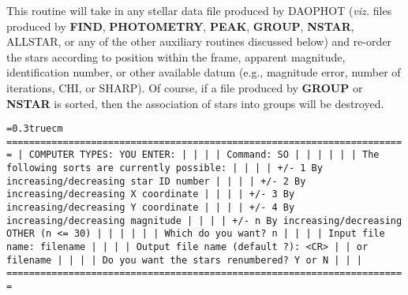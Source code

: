 This routine will take in any stellar data file produced by DAOPHOT
({\it viz.} files produced by {\bf FIND}, {\bf PHOTOMETRY}, {\bf PEAK},
{\bf GROUP}, {\bf NSTAR}, ALLSTAR, or any of the other auxiliary
routines discussed below) and re-order the stars according to position
within the frame, apparent magnitude, identification number, or other
available datum (e.g., magnitude error, number of iterations, CHI, or
SHARP).  Of course, if a file produced by {\bf GROUP} or {\bf NSTAR} is
sorted, then the association of stars into groups will be destroyed.

\bigskip
{\noindent\obeylines\obeyspaces\frenchspacing\tt\baselineskip=0.3truecm
=======================================================================
| COMPUTER TYPES:                                      YOU ENTER:     |
|                                                                     |
| Command:                                             SO             |
|                                                                     |
|                                                                     |
|      The following sorts are currently possible:                    |
|                                                                     |
|   +/- 1  By increasing/decreasing star ID number                    |
|                                                                     |
|   +/- 2  By increasing/decreasing  X  coordinate                    |
|                                                                     |
|   +/- 3  By increasing/decreasing  Y  coordinate                    |
|                                                                     |
|   +/- 4  By increasing/decreasing magnitude                         |
|                                                                     |
|   +/- n  By increasing/decreasing OTHER (n <= 30)                   |
|                                                                     |
|                                                                     |
|                          Which do you want?          n              |
|                                                                     |
|                            Input file name:          filename       |
|                                                                     |
|               Output file name (default ?):          <CR>           |
|                                                   or filename       |
|                                                                     |
|           Do you want the stars renumbered?          Y or N         |
|                                                                     |
=======================================================================
}
\bigskip

